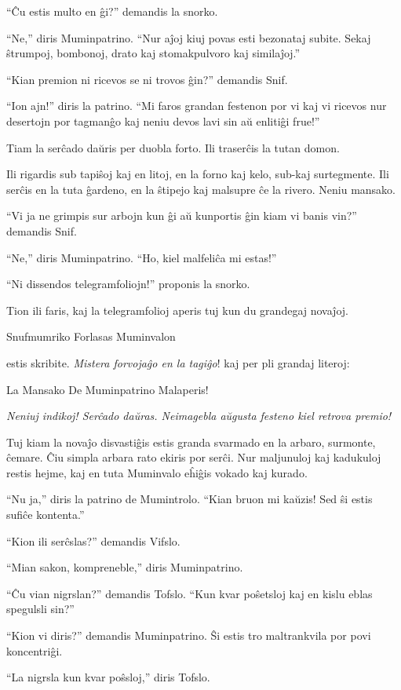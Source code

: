 ``Ĉu estis multo en ĝi?'' demandis la snorko.

``Ne,'' diris Muminpatrino. ``Nur aĵoj kiuj povas esti bezonataj subite. Sekaj ŝtrumpoj, bombonoj, drato kaj stomakpulvoro kaj similaĵoj.''

``Kian premion ni ricevos se ni trovos ĝin?'' demandis Snif.

``Ion ajn!'' diris la patrino. ``Mi faros grandan festenon por vi kaj vi ricevos nur desertojn por tagmanĝo kaj neniu devos lavi sin aŭ enlitiĝi frue!''

Tiam la serĉado daŭris per duobla forto. Ili traserĉis la tutan domon.

Ili rigardis sub tapiŝoj kaj en litoj, en la forno kaj kelo, sub-kaj surtegmente. Ili serĉis en la tuta ĝardeno, en la ŝtipejo kaj malsupre ĉe la rivero. Neniu mansako.

``Vi ja ne grimpis sur arbojn kun ĝi aŭ kunportis ĝin kiam vi banis vin?'' demandis Snif.

``Ne,'' diris Muminpatrino. ``Ho, kiel malfeliĉa mi estas!''

``Ni dissendos telegramfoliojn!'' proponis la snorko.

Tion ili faris, kaj la telegramfolioj aperis tuj kun du grandegaj novaĵoj.

Snufmumriko Forlasas Muminvalon

estis skribite. \emph{Mistera forvojaĝo en la tagiĝo}! kaj per pli grandaj literoj:

La Mansako De Muminpatrino Malaperis!

\emph{Neniuj indikoj! Serĉado daŭras. Neimagebla aŭgusta festeno kiel retrova premio!}

Tuj kiam la novaĵo disvastiĝis estis granda svarmado en la arbaro, surmonte, ĉemare. Ĉiu simpla arbara rato ekiris por serĉi. Nur maljunuloj kaj kadukuloj restis hejme, kaj en tuta Muminvalo eĥiĝis vokado kaj kurado.

``Nu ja,'' diris la patrino de Mumintrolo. ``Kian bruon mi kaŭzis! Sed ŝi estis sufiĉe kontenta.''

``Kion ili serĉslas?'' demandis Vifslo.

``Mian sakon, kompreneble,'' diris Muminpatrino.

``Ĉu vian nigrslan?'' demandis Tofslo. ``Kun kvar poŝetsloj kaj en kislu eblas spegulsli sin?''

``Kion vi diris?'' demandis Muminpatrino. Ŝi estis tro maltrankvila por povi koncentriĝi.

``La nigrsla kun kvar poŝsloj,'' diris Tofslo.

